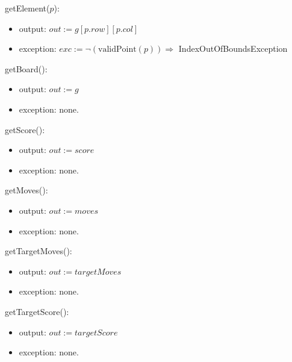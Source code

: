 \documentclass[12pt]{article}
\begin{document}
\noindent getElement($p$):

\begin{itemize}

\item output: $out := g[p.row][p.col]$

\item exception: $exc := \lnot (\mbox{validPoint}(p)) \Rightarrow$ IndexOutOfBoundsException

\end{itemize}

\noindent getBoard():

\begin{itemize}

\item output: $out := g$

\item exception: none.

\end{itemize}

\noindent getScore():

\begin{itemize}

\item output: $out := score$

\item exception: none.

\end{itemize}

\noindent getMoves():

\begin{itemize}

\item output: $out := moves$

\item exception: none.

\end{itemize}

\noindent getTargetMoves():

\begin{itemize}

\item output: $out := targetMoves$

\item exception: none.

\end{itemize}

\noindent getTargetScore():

\begin{itemize}

\item output: $out := targetScore$

\item exception: none.

\end{itemize}
\end{document}
